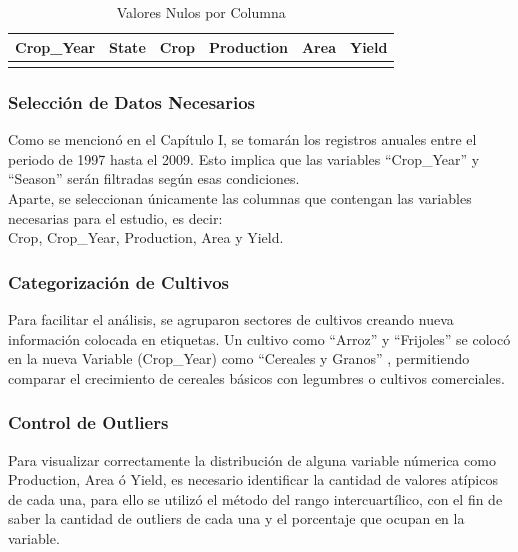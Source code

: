 \documentclass[oneside,11pt]{Latex/Classes/PhDthesisPSnPDF}
\begin{document}
\begin{table}[!h]
\centering
\caption{\label{tab:unnamed-chunk-1}Valores Nulos por Columna}
\centering
\fontsize{10}{12}\selectfont
\begin{tabular}[t]{rrrrrr}
\toprule
Crop\_Year & State & Crop & Production & Area & Yield\\
\midrule
\cellcolor{gray!10}{0} & \cellcolor{gray!10}{0} & \cellcolor{gray!10}{0} & \cellcolor{gray!10}{0} & \cellcolor{gray!10}{0} & \cellcolor{gray!10}{0}\\
\bottomrule
\end{tabular}
\end{table}

\subsubsection{Selección de Datos Necesarios}

Como se mencionó en el Capítulo I, se tomarán los registros anuales
entre el periodo de 1997 hasta el 2009. Esto implica que las variables
``Crop\_Year'' y ``Season'' serán filtradas según esas condiciones.\\

Aparte, se seleccionan únicamente las columnas que contengan las
variables necesarias para el estudio, es decir:\\

Crop, Crop\_Year, Production, Area y Yield.\\

\subsubsection{Categorización de Cultivos}

Para facilitar el análisis, se agruparon sectores de cultivos creando
nueva información colocada en etiquetas. Un cultivo como ``Arroz'' y
``Frijoles'' se colocó en la nueva Variable (Crop\_Year) como ``Cereales
y Granos'' , permitiendo comparar el crecimiento de cereales básicos con
legumbres o cultivos comerciales.\\

\subsubsection{Control de Outliers}

Para visualizar correctamente la distribución de alguna variable
númerica como Production, Area ó Yield, es necesario identificar la
cantidad de valores atípicos de cada una, para ello se utilizó el método
del rango intercuartílico, con el fin de saber la cantidad de outliers
de cada una y el porcentaje que ocupan en la variable.\\
\end{document}
